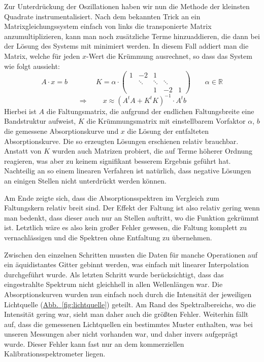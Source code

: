 \documentclass[11pt]{scrartcl}
\newcommand{\hypref}[2]{\hyperref[#2]{{#1}~\ref{#2}}}
\begin{document}
Zur Unterdrückung der Oszillationen haben wir nun die Methode der kleinsten Quadrate instrumentalisiert.
Nach dem bekannten Trick an ein Matrixgleichungssystem einfach von links die transponierte Matrix anzumultiplizieren, kann man noch zusätzliche Terme hinzuaddieren, die dann bei der Lösung des Systems mit minimiert werden.
In diesem Fall addiert man die Matrix, welche für jeden $x$-Wert die Krümmung ausrechnet, so dass das System wie folgt aussieht:
\begin{equation}
A\cdot x = b
\qquad\qquad
K = \alpha\cdot
\begin{pmatrix} 
  1 &	-2 &	1 &	&	\\
  &	\ddots&	\ddots&	\ddots&	\\
  &	&	1 &	-2 &	1
\end{pmatrix} 
\qquad
\alpha\in\mathbb{R}
\end{equation}
\begin{equation}
\Rightarrow\qquad
x \approx (A^t A + K^t K)^{-1}\cdot  A^t b
\end{equation}
Hierbei ist $A$ die Faltungsmatrix, die aufgrund der endlichen Faltungsbreite eine Bandstruktur aufweist, $K$ die Krümmungsmatrix mit einstellbarem Vorfaktor $\alpha$, $b$ die gemessene Absorptionskurve und $x$ die Lösung der entfalteten Absorptionskurve.
Die so erzeugten Lösungen erschienen relativ brauchbar.
Anstatt von $K$ wurden auch Matrizen probiert, die auf Terme höherer Ordnung reagieren, was aber zu keinem signifikant besserem Ergebnis geführt hat.
Nachteilig an so einem linearen Verfahren ist natürlich, dass negative Lösungen an einigen Stellen nicht unterdrückt werden können.

Am Ende zeigte sich, dass die Absorptionsspektren im Vergleich zum Faltungskern relativ breit sind.
Der Effekt der Faltung ist also relativ gering wenn man bedenkt, dass dieser auch nur an Stellen auftritt, wo die Funktion gekrümmt ist.
Letztlich wäre es also kein großer Fehler gewesen, die Faltung komplett zu vernachlässigen und die Spektren ohne Entfaltung zu übernehmen.

Zwischen den einzelnen Schritten mussten die Daten für manche Operationen auf ein äquidistantes Gitter gebinnt werden, was einfach mit linearer Interpolation durchgeführt wurde.
Als letzten Schritt wurde berücksichtigt, dass das eingestrahlte Spektrum nicht gleichhell in allen Wellenlängen war.
Die Absorptionskurven wurden nun einfach noch durch die Intensität der jeweiligen Lichtquelle (\hypref{Abb.}{fig:lichtquelle}) geteilt.
Am Rand des Spektralbereichs, wo die Intensität gering war, sieht man daher auch die größten Fehler.
Weiterhin fällt auf, dass die gemessenen Lichtquellen ein bestimmtes Muster enthalten, was bei unseren Messungen aber nicht vorhanden war, und daher invers aufgeprägt wurde.
Dieser Fehler kann fast nur an dem kommerziellen Kalibrations\-spektrometer liegen.
\end{document}
